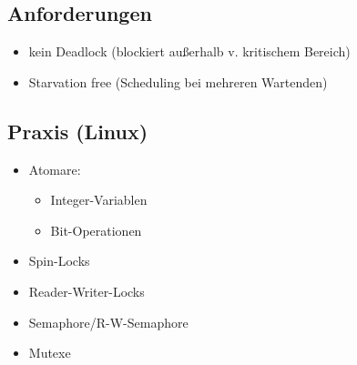 \subsection{Anforderungen}
\begin{itemize}
    \item kein Deadlock (blockiert außerhalb v. kritischem Bereich)
    \item Starvation free (Scheduling bei mehreren Wartenden)
\end{itemize}

\subsection{Praxis (Linux)}
\begin{itemize}
    \item Atomare:
    \begin{itemize}
        \item Integer-Variablen
        \item Bit-Operationen
    \end{itemize}
    \item Spin-Locks
    \item Reader-Writer-Locks
    \item Semaphore/R-W-Semaphore
    \item Mutexe
\end{itemize}